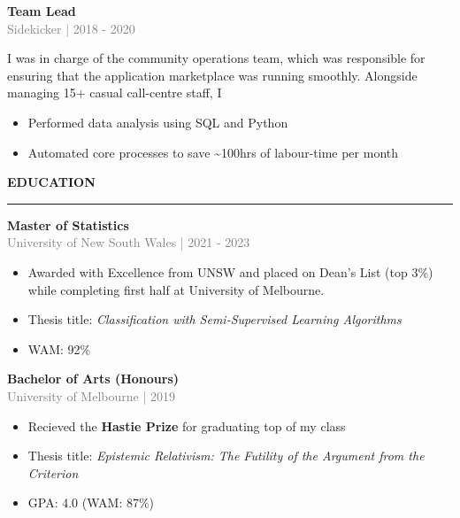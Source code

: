 \documentclass[10pt]{article}
\begin{document}
{\bf Team Lead} \\
\textcolor{gray}{Sidekicker | 2018 - 2020} \\[3pt]
\begin{small}

I was in charge of the community operations team, which was responsible for ensuring that the application marketplace was running smoothly. 
Alongside managing 15+ casual call-centre staff, I

\begin{itemize}
\item Performed data analysis using SQL and Python
\item Automated core processes to save \textasciitilde{}100hrs of labour-time per month
\end{itemize}

\end{small}

\vspace{1cm}
\begin{large}
{\bf EDUCATION} \\
\textcolor{gray}{\rule{2cm}{2mm}}
\end{large}
\vspace{5pt}

{\bf Master of Statistics} \\
\textcolor{gray}{University of New South Wales | 2021 - 2023} 
\begin{small}
\begin{itemize}
\item Awarded with Excellence from UNSW and placed on Dean's List (top 3\%) while completing first half at University of Melbourne.
\item Thesis title: \emph{Classification with Semi-Supervised Learning Algorithms}
\item WAM: 92\%
\end{itemize}
\end{small}

\vspace{0.5cm}
{\bf Bachelor of Arts (Honours)} \\
\textcolor{gray}{University of Melbourne | 2019} 
\begin{small}
\begin{itemize}
\item Recieved the \textbf{Hastie Prize} for graduating top of my class
\item Thesis title: \emph{Epistemic Relativism: The Futility of the Argument from the Criterion}
\item GPA: 4.0 (WAM: 87\%)
\end{itemize}
\end{small}
\end{document}
